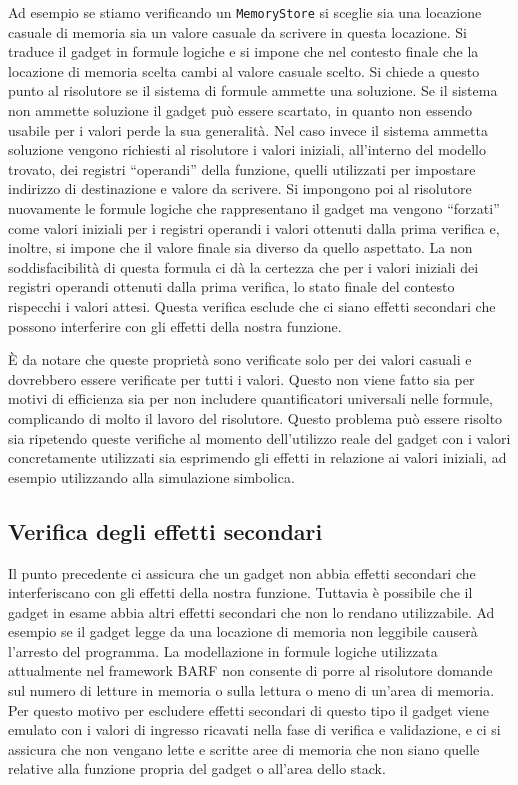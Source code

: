 Ad esempio se stiamo verificando un \lstinline{MemoryStore} si sceglie
sia una locazione casuale di memoria sia un valore casuale da scrivere
in questa locazione. Si traduce il gadget in formule logiche e si
impone che nel contesto finale che la locazione di memoria scelta
cambi al valore casuale scelto. Si chiede a questo punto al risolutore
se il sistema di formule ammette una soluzione. Se il sistema non
ammette soluzione il gadget può essere scartato, in quanto non essendo
usabile per i valori perde la sua generalità. Nel caso invece il
sistema ammetta soluzione vengono richiesti al risolutore i valori
iniziali, all'interno del modello trovato, dei registri ``operandi''
della funzione, quelli utilizzati per impostare indirizzo di
destinazione e valore da scrivere. Si impongono poi al risolutore
nuovamente le formule logiche che rappresentano il gadget ma vengono
``forzati'' come valori iniziali per i registri operandi i valori
ottenuti dalla prima verifica e, inoltre, si impone che il valore
finale sia diverso da quello aspettato. La non soddisfacibilità di
questa formula ci dà la certezza che per i valori iniziali dei
registri operandi ottenuti dalla prima verifica, lo stato finale del
contesto rispecchi i valori attesi. Questa verifica esclude che ci
siano effetti secondari che possono interferire con gli effetti della
nostra funzione.

È da notare che queste proprietà sono verificate solo per dei valori
casuali e dovrebbero essere verificate per tutti i valori. Questo non
viene fatto sia per motivi di efficienza sia per non includere
quantificatori universali nelle formule, complicando di molto il
lavoro del risolutore. Questo problema può essere risolto sia
ripetendo queste verifiche al momento dell'utilizzo reale del gadget
con i valori concretamente utilizzati sia esprimendo gli effetti in
relazione ai valori iniziali, ad esempio utilizzando alla simulazione
simbolica.

\subsection{Verifica degli effetti secondari}  

Il punto precedente ci assicura che un gadget non abbia effetti
secondari che interferiscano con gli effetti della nostra
funzione. Tuttavia è possibile che il gadget in esame abbia altri
effetti secondari che non lo rendano utilizzabile. Ad esempio se il
gadget legge da una locazione di memoria non leggibile causerà
l'arresto del programma. La modellazione in formule logiche utilizzata
attualmente nel framework BARF non consente di porre al risolutore
domande sul numero di letture in memoria o sulla lettura o meno di
un'area di memoria. Per questo motivo per escludere effetti secondari
di questo tipo il gadget viene emulato con i valori di ingresso
ricavati nella fase di verifica e validazione, e ci si assicura che
non vengano lette e scritte aree di memoria che non siano quelle
relative alla funzione propria del gadget o all'area dello stack.


